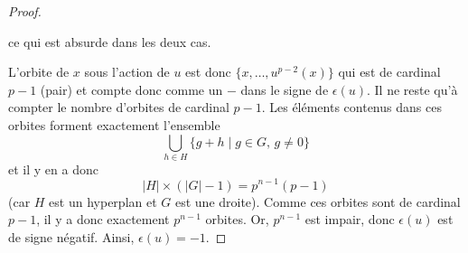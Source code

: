 \begin{proof}
\begin{itemize}
      ce qui est absurde dans les deux cas.
    \end{itemize}
    L'orbite de $x$ sous l'action de $u$ est donc $\{ x, \dots, u^{p-2}(x) \}$ qui est de cardinal $p-1$ (pair) et compte donc comme un $-$ dans le signe de $\epsilon(u)$.
    \newpar
    Il ne reste qu'à compter le nombre d'orbites de cardinal $p-1$. Les éléments contenus dans ces orbites forment exactement l'ensemble
    \[ \bigcup_{h \in H} \{ g + h \mid g \in G, \, g \neq 0 \} \]
    et il y en a donc
    \[ |H| \times (|G|-1) = p^{n-1}(p-1) \]
    (car $H$ est un hyperplan et $G$ est une droite). Comme ces orbites sont de cardinal $p-1$, il y a donc exactement $p^{n-1}$ orbites. Or, $p^{n-1}$ est impair, donc $\epsilon(u)$ est de signe négatif. Ainsi, $\epsilon(u) = -1$.
  \end{proof}

